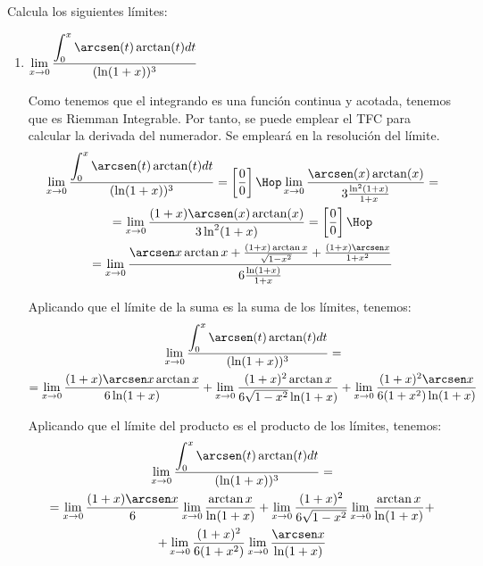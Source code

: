 \documentclass[12pt]{article}
\begin{document}
\begin{ejercicio} 
    Calcula los siguientes límites:
    \begin{enumerate}
        \item $\displaystyle \lim_{x\to 0} \frac{\displaystyle \int_0^x \arcsen(t)\arctan(t)dt}{(\ln (1+x))^3}$

        Como tenemos que el integrando es una función continua y acotada, tenemos que es Riemman Integrable. Por tanto, se puede emplear el TFC para calcular la derivada del numerador. Se empleará en la resolución del límite.
        \begin{multline*}
            \lim_{x\to 0} \frac{\displaystyle \int_0^x \arcsen(t)\arctan(t)dt}{(\ln (1+x))^3} = \left[\frac{0}{0}\right] \Hop
            \lim_{x\to 0} \frac{\arcsen(x)\arctan(x)}{3\frac{\ln^2(1+x)}{1+x}}
            =\\= \lim_{x\to 0} \frac{(1+x)\arcsen(x)\arctan(x)}{3 \ln^2(1+x)}
            = \left[\frac{0}{0}\right] \Hop
            \\= \lim_{x\to 0} \frac{\arcsen x\arctan x + \frac{(1+x)\arctan x}{\sqrt{1-x^2}} + \frac{(1+x)\arcsen x}{1+x^2}}{6 \frac{\ln(1+x)}{1+x}}
        \end{multline*}

        Aplicando que el límite de la suma es la suma de los límites, tenemos:
        \begin{multline*}
            \lim_{x\to 0} \frac{\displaystyle \int_0^x \arcsen(t)\arctan(t)dt}{(\ln (1+x))^3}
            =\\= \lim_{x\to 0} \frac{(1+x)\arcsen x\arctan x}{6\ln(1+x)} + \lim_{x\to 0} \frac{(1+x)^2\arctan x}{6\sqrt{1-x^2}\ln(1+x)}
            + \lim_{x\to 0} \frac{(1+x)^2\arcsen x }{6(1+x^2)\ln (1+x)}
        \end{multline*}

        Aplicando que el límite del producto es el producto de los límites, tenemos:
        \begin{multline*}
            \lim_{x\to 0} \frac{\displaystyle \int_0^x \arcsen(t)\arctan(t)dt}{(\ln (1+x))^3}
            =\\= 
            \lim_{x\to 0} \frac{(1+x)\arcsen x}{6}\lim_{x\to 0} \frac{\arctan x}{\ln(1+x)}
            + \lim_{x\to 0} \frac{(1+x)^2}{6\sqrt{1-x^2}} \lim_{x\to 0} \frac{\arctan x}{\ln(1+x)}
            +\\ + \lim_{x\to 0} \frac{(1+x)^2}{6(1+x^2)}
            \lim_{x\to 0} \frac{\arcsen x }{\ln (1+x)}
        \end{multline*}



\end{enumerate}
\end{ejercicio}
\end{document}
